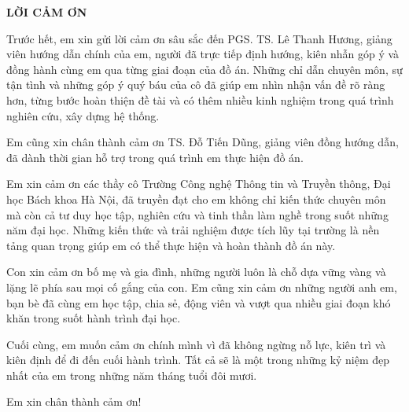 \documentclass[../DoAn.tex]{subfiles}
\begin{document}
\begin{center}
\Large{\textbf{LỜI CẢM ƠN}}\
\end{center}
\vspace{1cm}

Trước hết, em xin gửi lời cảm ơn sâu sắc đến PGS. TS. Lê Thanh Hương, giảng viên hướng dẫn chính của em, người đã trực tiếp định hướng, kiên nhẫn góp ý và đồng hành cùng em qua từng giai đoạn của đồ án. Những chỉ dẫn chuyên môn, sự tận tình và những góp ý quý báu của cô đã giúp em nhìn nhận vấn đề rõ ràng hơn, từng bước hoàn thiện đề tài và có thêm nhiều kinh nghiệm trong quá trình nghiên cứu, xây dựng hệ thống.

Em cũng xin chân thành cảm ơn TS. Đỗ Tiến Dũng, giảng viên đồng hướng dẫn, đã dành thời gian hỗ trợ trong quá trình em thực hiện đồ án.

Em xin cảm ơn các thầy cô Trường Công nghệ Thông tin và Truyền thông, Đại học Bách khoa Hà Nội, đã truyền đạt cho em không chỉ kiến thức chuyên môn mà còn cả tư duy học tập, nghiên cứu và tinh thần làm nghề trong suốt những năm đại học. Những kiến thức và trải nghiệm được tích lũy tại trường là nền tảng quan trọng giúp em có thể thực hiện và hoàn thành đồ án này.

Con xin cảm ơn bố mẹ và gia đình, những người luôn là chỗ dựa vững vàng và lặng lẽ phía sau mọi cố gắng của con. Em cũng xin cảm ơn những người anh em, bạn bè đã cùng em học tập, chia sẻ, động viên và vượt qua nhiều giai đoạn khó khăn trong suốt hành trình đại học.

Cuối cùng, em muốn cảm ơn chính mình vì đã không ngừng nỗ lực, kiên trì và kiên định để đi đến cuối hành trình. Tất cả sẽ là một trong những kỷ niệm đẹp nhất của em trong những năm tháng tuổi đôi mươi.

Em xin chân thành cảm ơn!
\end{document}
